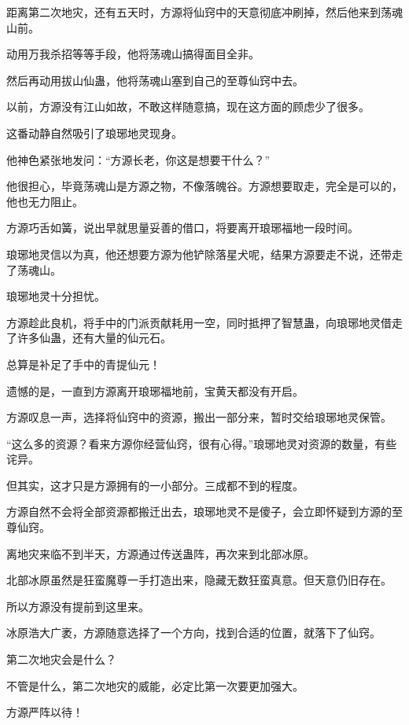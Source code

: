 \begin{this_body}
距离第二次地灾，还有五天时，方源将仙窍中的天意彻底冲刷掉，然后他来到荡魂山前。

动用万我杀招等等手段，他将荡魂山搞得面目全非。

然后再动用拔山仙蛊，他将荡魂山塞到自己的至尊仙窍中去。

以前，方源没有江山如故，不敢这样随意搞，现在这方面的顾虑少了很多。

这番动静自然吸引了琅琊地灵现身。

他神色紧张地发问：“方源长老，你这是想要干什么？”

他很担心，毕竟荡魂山是方源之物，不像落魄谷。方源想要取走，完全是可以的，他也无力阻止。

方源巧舌如簧，说出早就思量妥善的借口，将要离开琅琊福地一段时间。

琅琊地灵信以为真，他还想要方源为他铲除落星犬呢，结果方源要走不说，还带走了荡魂山。

琅琊地灵十分担忧。

方源趁此良机，将手中的门派贡献耗用一空，同时抵押了智慧蛊，向琅琊地灵借走了许多仙蛊，还有大量的仙元石。

总算是补足了手中的青提仙元！

遗憾的是，一直到方源离开琅琊福地前，宝黄天都没有开启。

方源叹息一声，选择将仙窍中的资源，搬出一部分来，暂时交给琅琊地灵保管。

“这么多的资源？看来方源你经营仙窍，很有心得。”琅琊地灵对资源的数量，有些诧异。

但其实，这才只是方源拥有的一小部分。三成都不到的程度。

方源自然不会将全部资源都搬迁出去，琅琊地灵不是傻子，会立即怀疑到方源的至尊仙窍。

离地灾来临不到半天，方源通过传送蛊阵，再次来到北部冰原。

北部冰原虽然是狂蛮魔尊一手打造出来，隐藏无数狂蛮真意。但天意仍旧存在。

所以方源没有提前到这里来。

冰原浩大广袤，方源随意选择了一个方向，找到合适的位置，就落下了仙窍。

第二次地灾会是什么？

不管是什么，第二次地灾的威能，必定比第一次要更加强大。

方源严阵以待！

\end{this_body}

